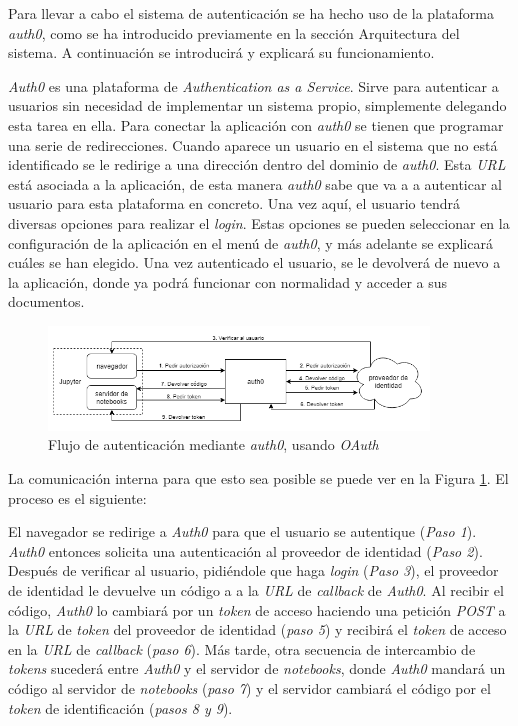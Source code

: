 \documentclass[11pt,spanish,listoffigures]{tfgetsinf}
\begin{document}
Para llevar a cabo el sistema de autenticación se ha hecho uso de la plataforma \textit{auth0}, como se ha introducido previamente en la sección Arquitectura del sistema. A continuación se introducirá y explicará su funcionamiento.

\textit{Auth0} es una plataforma de \textit{Authentication as a Service}. Sirve para autenticar a usuarios sin necesidad de implementar un sistema propio, simplemente delegando esta tarea en ella. Para conectar la aplicación con \textit{auth0} se tienen que programar una serie de redirecciones. Cuando aparece un usuario en el sistema que no está identificado se le redirige a una dirección dentro del dominio de \textit{auth0}. Esta \textit{URL} está asociada a la aplicación, de esta manera \textit{auth0} sabe que va a a autenticar al usuario para esta plataforma en concreto. Una vez aquí, el usuario tendrá diversas opciones para realizar el \textit{login}. Estas opciones se pueden seleccionar en la configuración de la aplicación en el menú de \textit{auth0}, y más adelante se explicará cuáles se han elegido. Una vez autenticado el usuario, se le devolverá de nuevo a la aplicación, donde ya podrá funcionar con normalidad y acceder a sus documentos.

\begin{figure}[h]
	\centering
  	\includegraphics[width=0.9\textwidth]{auth0-flow.png}
  	\caption{Flujo de autenticación mediante \textit{auth0}, usando \textit{OAuth}}
  	\label{fig:auth0-scheme}
\end{figure}

La comunicación interna para que esto sea posible se puede ver en la Figura \ref{fig:auth0-scheme}. El proceso es el siguiente: 

El navegador se redirige a \textit{Auth0} para que el usuario se autentique (\textit{Paso 1}). \textit{Auth0} entonces solicita una autenticación al proveedor de identidad (\textit{Paso 2}). Después de verificar al usuario, pidiéndole que haga \textit{login} (\textit{Paso 3}), el proveedor de identidad le devuelve un código a a la \textit{URL} de \textit{\gls{callback}} de \textit{Auth0}. Al recibir el código, \textit{Auth0} lo cambiará por un \textit{token} de acceso haciendo una petición \textit{POST} a la \textit{URL} de \textit{token} del proveedor de identidad (\textit{paso 5}) y recibirá el \textit{token} de acceso en la \textit{URL} de \textit{callback} (\textit{paso 6}). Más tarde, otra secuencia de intercambio de \textit{tokens} sucederá entre \textit{Auth0} y el servidor de \textit{notebooks}, donde \textit{Auth0} mandará un código al servidor de \textit{notebooks} (\textit{paso 7}) y el servidor cambiará el código por el \textit{token} de identificación (\textit{pasos 8 y 9}).
\end{document}
